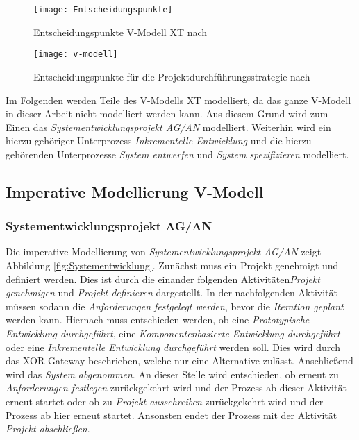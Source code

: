  
 
 \begin{figure}[!htbp]
\begin{center}
  \texttt{[image: Entscheidungspunkte]} %
  \caption{Entscheidungspunkte V-Modell XT nach \cite{2004vmodell}}
  \label{fig:entscheidungspunkte}
\end{center}
\end{figure}
 
\begin{sidewaysfigure}[!htbp]
\begin{center}
  \texttt{[image: v-modell]} %
  \caption{Entscheidungspunkte für die Projektdurchführungsstrategie nach \cite{2004vmodell}}
  \label{fig:v-modell}
\end{center}
\end{sidewaysfigure}

Im Folgenden werden Teile des V-Modells XT modelliert, da das ganze V-Modell in dieser Arbeit nicht  modelliert werden kann. Aus diesem Grund wird zum Einen das \textit{Systementwicklungsprojekt AG/AN} modelliert. Weiterhin wird ein hierzu gehöriger Unterprozess \textit{Inkrementelle Entwicklung} und die hierzu gehörenden Unterprozesse \textit{System entwerfen} und \textit{System spezifizieren} modelliert.
\clearpage

\subsection{Imperative Modellierung V-Modell}



\subsubsection{Systementwicklungsprojekt AG/AN}


Die imperative Modellierung von \textit{Systementwicklungsprojekt AG/AN}  zeigt Abbildung \ref{fig:Systementwicklung}. \newline
Zunächst muss ein Projekt genehmigt und definiert werden. Dies ist durch die einander folgenden Aktivitäten\textit{Projekt genehmigen} und \textit{Projekt definieren} dargestellt.\newline
In der nachfolgenden Aktivität müssen sodann die \textit{Anforderungen festgelegt werden}, bevor die \textit{Iteration geplant} werden kann. \newline
Hiernach muss entschieden werden, ob eine \textit{Prototypische Entwicklung durchgeführt}, eine \textit{Komponentenbasierte Entwicklung durchgeführt} oder eine \textit{Inkrementelle Entwicklung durchgeführt} werden soll. Dies wird durch das XOR-Gateway beschrieben, welche nur eine Alternative zulässt.\newline
Anschließend wird das \textit{System abgenommen}.\newline
An dieser Stelle wird entschieden, ob erneut zu \textit{Anforderungen festlegen} zurückgekehrt wird und der Prozess ab dieser Aktivität erneut startet oder ob zu \textit{Projekt ausschreiben} zurückgekehrt wird und der Prozess ab hier erneut startet. Ansonsten endet der Prozess mit der Aktivität \textit{Projekt abschließen}.

